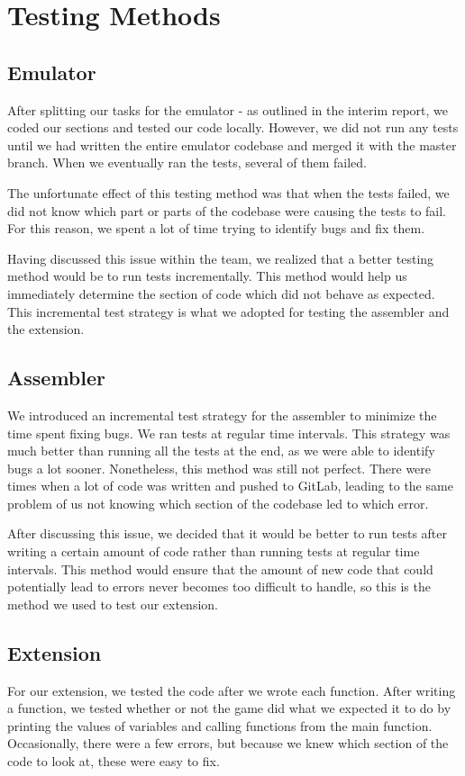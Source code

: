 \documentclass[11pt]{article}
\begin{document}
\section{Testing Methods}
\subsection{Emulator}
\-\hspace{0.6cm}After splitting our tasks for the emulator - as outlined in the interim report, we coded our sections and tested our code locally. However, we did not run any tests until we had written the entire emulator codebase and merged it with the master branch. When we eventually ran the tests, several of them failed. 

The unfortunate effect of this testing method was that when the tests failed, we did not know which part or parts of the codebase were causing the tests to fail. For this reason, we spent a lot of time trying to identify bugs and fix them. 

Having discussed this issue within the team, we realized that a better testing method would be to run tests incrementally. This method would help us immediately determine the section of code which did not behave as expected. This incremental test strategy is what we adopted for testing the assembler and the extension. 

\subsection{Assembler}
\-\hspace{0.6cm}We introduced an incremental test strategy for the assembler to minimize the time spent fixing bugs. We ran tests at regular time intervals. This strategy was much better than running all the tests at the end, as we were able to identify bugs a lot sooner. Nonetheless, this method was still not perfect. There were times when a lot of code was written and pushed to GitLab, leading to the same problem of us not knowing which section of the codebase led to which error. 

After discussing this issue, we decided that it would be better to run tests after writing a certain amount of code rather than running tests at regular time intervals. This method would ensure that the amount of new code that could potentially lead to errors never becomes too difficult to handle, so this is the method we used to test our extension.

\subsection{Extension}
\-\hspace{0.6cm}For our extension, we tested the code after we wrote each function. After writing a function, we tested whether or not the game did what we expected it to do by printing the values of variables and calling functions from the main function. Occasionally, there were a few errors, but because we knew which section of the code to look at, these were easy to fix. 
\end{document}
